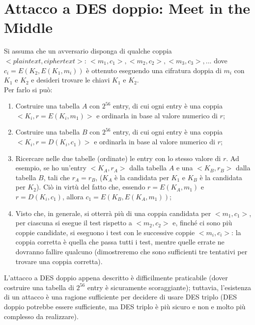 \section{Attacco a DES doppio: Meet in the Middle} \label{par:meetinthe}
Si assuma che un avversario disponga di qualche coppia $<plaintext, ciphertext>$: $<m_{1},c_{1}> , <m_{2},c_{2}> , <m_{3},c_{3}> , ...$ dove $c_{i} = E(K_{2}, E(K_{1}, m_{i}))$ è ottenuto eseguendo una cifratura doppia di $m_{i}$ con $K_{1}$ e $K_{2}$ e desideri trovare le chiavi $K_{1}$ e $K_{2}$. \\
Per farlo si può:
\begin{enumerate}
\item Costruire una tabella $A$ con $2^{56}$ entry, di cui ogni entry è una coppia $<K_{i}, r = E(K_{i}, m_{1})>$ e ordinarla in base al valore numerico di $r$;
\item Costruire una tabella $B$ con $2^{56}$ entry, di cui ogni entry è una coppia $<K_{i}, r = D(K_{i}, c_{1})>$ e ordinarla in base al valore numerico di $r$;
\item Ricercare nelle due tabelle (ordinate) le entry con lo stesso valore di $r$. Ad esempio, se ho un'entry $<K_{A},r_A>$ dalla tabella $A$ e una $<K_{B},r_B>$ dalla tabella $B$, tali che $r_A = r_B $, ($K_{A}$ è la candidata per $K_{1}$ e $K_{B}$ è la candidata per $K_{2}$). Ciò in virtù del fatto che, essendo $r = E(K_{A}, m_{1})$ e $r = D(K_{i}, c_{1})$, allora $c_{1} = E(K_{B}, E(K_{A}, m_{1}))$;
\item Visto che, in generale, si otterrà più di una coppia candidata per $<m_{1},c_{1}>$, per ciascuna si esegue il test rispetto a $<m_{2},c_{2}>$ e, finché ci sono più coppie candidate, si eseguono i test con le successive coppie $<m_{i},c_{i}>$: la coppia corretta è quella che passa tutti i test, mentre quelle errate ne dovranno fallire qualcuno (dimostreremo che sono sufficienti tre tentativi per trovare una coppia corretta). 
\end{enumerate} 
L'attacco a DES doppio appena descritto è difficilmente praticabile (dover costruire una tabella di $2^{56}$ entry è sicuramente scoraggiante); tuttavia, l'esistenza di un attacco è una ragione sufficiente per decidere di usare DES triplo (DES doppio potrebbe essere sufficiente, ma DES triplo è più sicuro e non e molto più complesso da realizzare).
